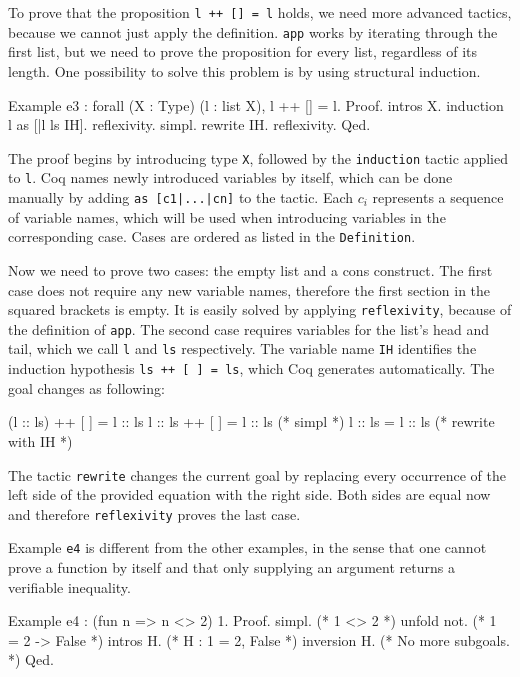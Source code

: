 \documentclass[fleqn, abstract=on]{scrreprt}
\newcommand{\coqinline}[1]{\texttt{#1}}
\begin{document}
\par
To prove that the proposition \coqinline{l ++ [] = l} holds, we need more advanced tactics, because we cannot just apply the definition. \coqinline{app} works by iterating through the first list, but we need to prove the proposition for every list, regardless of its length. One possibility to solve this problem is by using structural induction.
\begin{coqcode}
Example e3 : forall (X : Type) (l : list X), l ++ [] = l.
Proof. intros X. induction l as [|l ls IH].
  reflexivity.
  simpl. rewrite IH. reflexivity.
Qed.
\end{coqcode}
The proof begins by introducing type \coqinline{X}, followed by the \coqinline{induction} tactic applied to \coqinline{l}. Coq names newly introduced variables by itself, which can be done manually by adding \coqinline{as [c1|...|cn]} to the tactic. Each $c_{i}$ represents a sequence of variable names, which will be used when introducing variables in the corresponding case. Cases are ordered as listed in the \coqinline{Definition}.
\par
Now we need to prove two cases: the empty list and a cons construct. The first case does not require any new variable names, therefore the first section in the squared brackets is empty. It is easily solved by applying \coqinline{reflexivity}, because of the definition of \coqinline{app}.
The second case requires variables for the list's head and tail, which we call \coqinline{l} and \coqinline{ls} respectively. The variable name \coqinline{IH} identifies the induction hypothesis \coqinline{ls ++ [ ] = ls}, which Coq generates automatically. The goal changes as following:
\begin{coqcode}
(l :: ls) ++ [ ] = l :: ls
 l :: ls  ++ [ ] = l :: ls (* simpl *)
 l :: ls         = l :: ls (* rewrite with IH *)
\end{coqcode}
The tactic \coqinline{rewrite} changes the current goal by replacing every occurrence of the left side of the provided equation with the right side. Both sides are equal now and therefore \coqinline{reflexivity} proves the last case.
\par 
Example \coqinline{e4} is different from the other examples, in the sense that one cannot prove a function by itself and that only supplying an argument returns a verifiable inequality. 
\begin{coqcode}
Example e4 : (fun n => n <> 2) 1.
Proof.
  simpl.       (* 1 <> 2 *)
  unfold not.  (* 1 = 2 -> False *)
  intros H.    (* H : 1 = 2, False *)
  inversion H. (* No more subgoals. *)
Qed.
\end{coqcode}
\end{document}
